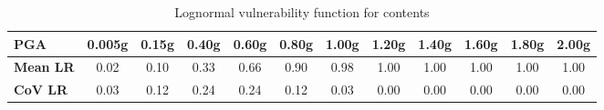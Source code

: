 \begin{table}[htbp]

\centering
\begin{tabular}{ l c c c c c c c c c c c}

\hline
\rowcolor{anti-flashwhite}
\bf{PGA} & \bf{0.005g} & \bf{0.15g} & \bf{0.40g} & \bf{0.60g} & \bf{0.80g} & \bf{1.00g} & \bf{1.20g} & \bf{1.40g} & \bf{1.60g} & \bf{1.80g} & \bf{2.00g} \\
\hline
\bf{Mean LR} & 0.02 & 0.10 & 0.33 & 0.66 & 0.90 & 0.98 & 1.00 & 1.00 & 1.00 & 1.00 & 1.00 \\
\bf{CoV LR} & 0.03 & 0.12 & 0.24 & 0.24 & 0.12 & 0.03 & 0.00 & 0.00 & 0.00 & 0.00 & 0.00 \\
\hline
\end{tabular}

\caption{Lognormal vulnerability function for contents}
\label{tab:vf-ln-tax1-con}
\end{table}